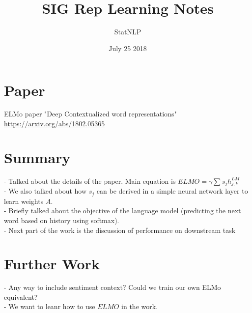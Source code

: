 \documentclass{article}
\title{SIG Rep Learning Notes}
\author{StatNLP}
\date{July 25 2018}
\begin{document}
\maketitle

\section{Paper}
ELMo paper "Deep Contextualized word representations" \url{https://arxiv.org/abs/1802.05365} 

\section{Summary}
- Talked about the details of the paper. Main equation is $ELMO = \gamma \sum s_j h^{LM}_{j,k}$ \\ 
- We also talked about how $s_j$ can be derived in a simple neural network layer to learn weights $A$. \\
- Briefly talked about the objective of the language model (predicting the next word based on history using softmax). \\
- Next part of the work is the discussion of performance on downstream task

\section{Further Work}
- Any way to include sentiment context? Could we train our own ELMo equivalent? \\
- We want to leanr how to use $ELMO$ in the work.
\end{document}
